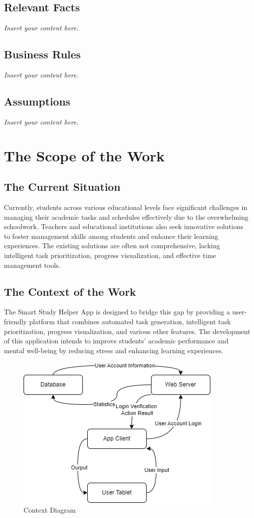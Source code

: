 \documentclass[12pt]{article}
\newcommand{\lips}{\textit{Insert your content here.}}
\begin{document}
\subsection{Relevant Facts}
\lips
\subsection{Business Rules}
\lips
\subsection{Assumptions}
\lips

\section{The Scope of the Work}

\subsection{The Current Situation}
Currently, students across various educational levels face significant challenges in managing their academic tasks and schedules effectively due to the overwhelming schoolwork. Teachers and educational institutions also seek innovative solutions to foster management skills among students and enhance their learning experiences. The existing solutions are often not comprehensive, lacking intelligent task prioritization, progress visualization, and effective time management tools.

\subsection{The Context of the Work}
The Smart Study Helper App is designed to bridge this gap by providing a user-friendly platform that combines automated task generation, intelligent task prioritization, progress visualization, and various other features. The development of this application intends to improve students' academic performance and mental well-being by reducing stress and enhancing learning experiences.
\begin{figure}[htbp]
    \centering
    \includegraphics[width=0.7\linewidth]{Context Diagram.drawio.png} 
    \caption{Context Diagram}
    \label{fig:samplelabel}
\end{figure}
\end{document}
